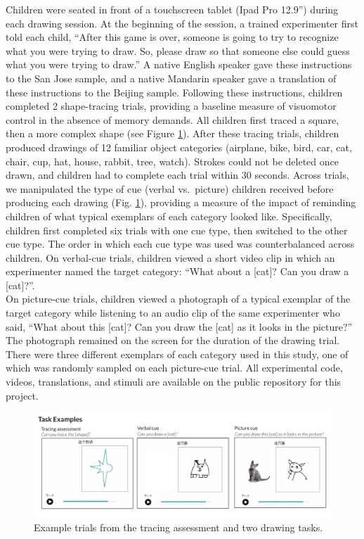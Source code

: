 \documentclass[
  man]{apa6}
\begin{document}
Children were seated in front of a touchscreen tablet (Ipad Pro 12.9'') during each drawing session.
At the beginning of the session, a trained experimenter first told each child, ``After this game is over, someone is going to try to recognize what you were trying to draw. So, please draw so that someone else could guess what you were trying to draw.''
A native English speaker gave these instructions to the San Jose sample, and a native Mandarin speaker gave a translation of these instructions to the Beijing sample.
Following these instructions, children completed 2 shape-tracing trials, providing a baseline measure of visuomotor control in the absence of memory demands.
All children first traced a square, then a more complex shape (see Figure \ref{fig:example-tasks}).
After these tracing trials, children produced drawings of 12 familiar object categories (airplane, bike, bird, car, cat, chair, cup, hat, house, rabbit, tree, watch).
Strokes could not be deleted once drawn, and children had to complete each trial within 30 seconds.
Across trials, we manipulated the type of cue (verbal vs.~picture) children received before producing each drawing (Fig. \ref{fig:example-tasks}), providing a measure of the impact of reminding children of what typical exemplars of each category looked like.
Specifically, children first completed six trials with one cue type, then switched to the other cue type.
The order in which each cue type was used was counterbalanced across children.
On verbal-cue trials, children viewed a short video clip in which an experimenter named the target category: ``What about a {[}cat{]}? Can you draw a {[}cat{]}?''.\\
On picture-cue trials, children viewed a photograph of a typical exemplar of the target category while listening to an audio clip of the same experimenter who said, ``What about this {[}cat{]}? Can you draw the {[}cat{]} as it looks in the picture?''
The photograph remained on the screen for the duration of the drawing trial.
There were three different exemplars of each category used in this study, one of which was randomly sampled on each picture-cue trial.
All experimental code, videos, translations, and stimuli are available on the public repository for this project.

\begin{figure}[H]
\includegraphics[width=1\linewidth]{figs/task_examples} \caption{Example trials from the tracing assessment and two drawing tasks.}\label{fig:example-tasks}
\end{figure}
\end{document}
